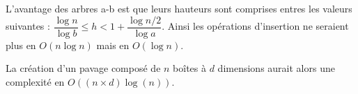 L'avantage des arbres a-b est que leurs hauteurs  sont comprises entres les valeurs suivantes : $ \dfrac{\log{n}}{\log{b}}   \leq h  < 1 + \dfrac{\log{n/2}}{\log{a}}$. Ainsi les opérations d'insertion ne seraient plus en $O(n\log{n})$ mais en $O(\log{n})$.

La création d'un pavage composé de $n$ boîtes à $d$ dimensions aurait alors une complexité en $O((n\times d)\log(n))$.


